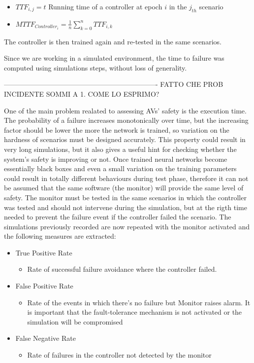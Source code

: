 \begin{itemize}
	\item $TTF_{i,j} = t$ Running time of a controller at epoch $i$ in the $j_{th}$ scenario 
	\item $MTTF_{Controller_{i}} = \frac{1}{n} \sum_{k = 0}^{n} TTF_{i,k}$
\end{itemize}

The controller is then trained again and re-tested in the same scenarios. 

Since we are working in a simulated environment, the time to failure was computed using simulations steps, without loss of generality.\newline 

-------------------------------------------------------------------        FATTO CHE PROB INCIDENTE SOMMI A 1. COME LO ESPRIMO?\newline

One of the main problem realated to assessing AVs' safety is the execution time. The probability of a failure increases monotonically over time, but the increasing factor should be lower the more the network is trained, so variation on the hardness of scenarios must be designed accurately. This property could result in very long simulations, but it also gives a useful hint for checking whether the system's safety is improving or not. \newline\newline
Once trained neural networks become essentially black boxes and even a small variation on the training parameters could result in totally different behaviours during test phase, therefore it can not be assumed that the same software (the monitor) will provide the same level of safety.\newline
The monitor must be tested in the same scenarios in which the controller was tested and should not intervene during the simulation, but at the rigth time needed to prevent the failure event if the controller failed the scenario. The simulations previously recorded are now repeated with the monitor activated and the following measures are extracted:

\begin{itemize}
	\item True Positive Rate
	\begin{itemize}
		\item Rate of successful failure avoidance where the controller failed.
	\end{itemize}
	\item False Positive Rate
	\begin{itemize}
		\item Rate of the events in which there's no failure but Monitor raises alarm. It is important that the fault-tolerance mechanism is not activated or the simulation will be compromised
	\end{itemize}
	\item False Negative Rate
	\begin{itemize}
		\item Rate of failures in the controller not detected by the monitor
	\end{itemize}
\end{itemize}

